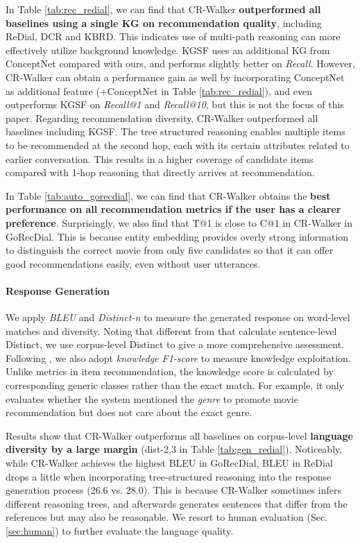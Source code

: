 \documentclass[11pt]{article}
\begin{document}
In Table \ref{tab:rec_redial}, we can find that CR-Walker \textbf{outperformed all baselines using a single KG on recommendation quality}, including ReDial, DCR and KBRD.  This indicates use of multi-path reasoning can more effectively utilize background knowledge. KGSF uses an additional KG from ConceptNet \cite{speer2017conceptnet} compared with ours, and performs slightly better on \textit{Recall}. However, CR-Walker can obtain a performance gain as well by incorporating ConceptNet as additional feature (+ConceptNet in Table \ref{tab:rec_redial}), and even outperforms KGSF on \textit{Recall@1} and \textit{Recall@10}, but this is not the focus of this paper. 
Regarding recommendation diversity, CR-Walker outperformed all baselines including KGSF. The tree structured reasoning enables multiple items to be recommended at the second hop, each with its certain attributes related to earlier conversation. This results in a higher coverage of candidate items compared with 1-hop reasoning that directly arrives at recommendation.

In Table \ref{tab:auto_gorecdial}, we can find that CR-Walker obtains the \textbf{best performance on all recommendation metrics if the user has a clearer preference}. Surprisingly, we also find that T@1 is close to C@1 in CR-Walker in GoRecDial. This is because entity embedding provides overly strong information to distinguish the correct movie from only five candidates so that it can offer good recommendations easily, even without user utterances.



\paragraph{Response Generation}
We apply \textit{BLEU} and \textit{Distinct-n} \cite{li2016diversity} to measure the generated response on word-level matches and diversity. Noting that different from \citet{chen2019towards} that calculate sentence-level Distinct, we use corpus-level Distinct to give a more comprehensive assessment. 
Following \citet{wu2019proactive}, we also adopt \textit{knowledge F1-score} to measure knowledge exploitation. Unlike metrics in item recommendation, the knowledge score is calculated by corresponding generic classes rather than the exact match. For example, it only evaluates whether the system mentioned the \textit{genre} to promote movie recommendation but does not care about the exact genre.

Results show that CR-Walker outperforms all baselines on corpus-level \textbf{language diversity by a large margin} (dist-2,3 in Table \ref{tab:gen_redial}). 
Noticeably, while CR-Walker achieves the highest BLEU in GoRecDial, BLEU in ReDial drops a little when incorporating tree-structured reasoning into the response generation process (26.6 vs. 28.0). This is because CR-Walker sometimes infers different reasoning trees, and afterwards generates sentences that differ from the references but may also be reasonable. We resort to human evaluation (Sec. \ref{sec:human}) to further evaluate the language quality.
\end{document}
